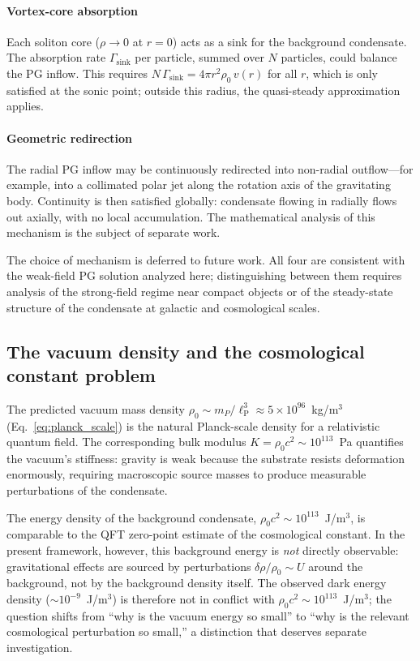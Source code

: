 \documentclass[12pt, a4paper]{article}
\newcommand{\lP}{\ell_{\mathrm{P}}}
\begin{document}
\paragraph{Vortex-core absorption} Each soliton core ($\rho \to 0$ at $r = 0$) acts as a sink for the background condensate. The absorption rate $\Gamma_{\mathrm{sink}}$ per particle, summed over $N$ particles, could balance the PG inflow. This requires $N\,\Gamma_{\mathrm{sink}} = 4\pi r^2 \rho_0\,v(r)$ for all $r$, which is only satisfied at the sonic point; outside this radius, the quasi-steady approximation applies.

\paragraph{Geometric redirection} The radial PG inflow may be continuously redirected into non-radial outflow---for example, into a collimated polar jet along the rotation axis of the gravitating body. Continuity is then satisfied globally: condensate flowing in radially flows out axially, with no local accumulation. The mathematical analysis of this mechanism is the subject of separate work.

The choice of mechanism is deferred to future work. All four are consistent with the weak-field PG solution analyzed here; distinguishing between them requires analysis of the strong-field regime near compact objects or of the steady-state structure of the condensate at galactic and cosmological scales.


\subsection{The vacuum density and the cosmological constant problem}

The predicted vacuum mass density $\rho_0 \sim m_P/\lP^3 \approx 5 \times 10^{96}$~kg/m$^3$ (Eq.~\ref{eq:planck_scale}) is the natural Planck-scale density for a relativistic quantum field. The corresponding bulk modulus $K = \rho_0 c^2 \sim 10^{113}$~Pa quantifies the vacuum's stiffness: gravity is weak because the substrate resists deformation enormously, requiring macroscopic source masses to produce measurable perturbations of the condensate.

The energy density of the background condensate, $\rho_0 c^2 \sim 10^{113}$~J/m$^3$, is comparable to the QFT zero-point estimate of the cosmological constant. In the present framework, however, this background energy is \emph{not} directly observable: gravitational effects are sourced by perturbations $\delta\rho/\rho_0 \sim U$ around the background, not by the background density itself. The observed dark energy density ($\sim 10^{-9}$~J/m$^3$) is therefore not in conflict with $\rho_0 c^2 \sim 10^{113}$~J/m$^3$; the question shifts from ``why is the vacuum energy so small'' to ``why is the relevant cosmological perturbation so small,'' a distinction that deserves separate investigation.
\end{document}
